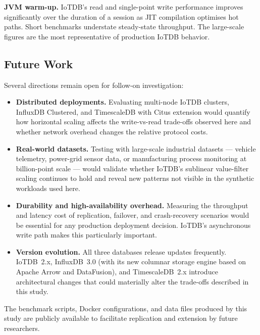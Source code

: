 \textbf{JVM warm-up.} IoTDB's read and single-point write performance improves significantly
over the duration of a session as JIT compilation optimises hot paths. Short benchmarks
understate steady-state throughput. The large-scale figures are the most representative of
production IoTDB behavior.

\subsection{Future Work}
\label{sec:future-work}

Several directions remain open for follow-on investigation:

\begin{itemize}
  \item \textbf{Distributed deployments.} Evaluating multi-node IoTDB clusters, InfluxDB
  Clustered, and TimescaleDB with Citus extension would quantify how horizontal scaling
  affects the write-vs-read trade-offs observed here and whether network overhead changes
  the relative protocol costs.

  \item \textbf{Real-world datasets.} Testing with large-scale industrial datasets ---
  vehicle telemetry, power-grid sensor data, or manufacturing process monitoring at
  billion-point scale --- would validate whether IoTDB's sublinear value-filter scaling
  continues to hold and reveal new patterns not visible in the synthetic workloads used here.

  \item \textbf{Durability and high-availability overhead.} Measuring the throughput and
  latency cost of replication, failover, and crash-recovery scenarios would be essential
  for any production deployment decision. IoTDB's asynchronous write path makes this
  particularly important.

  \item \textbf{Version evolution.} All three databases release updates frequently. IoTDB~2.x,
  InfluxDB~3.0 (with its new columnar storage engine based on Apache Arrow and DataFusion),
  and TimescaleDB~2.x introduce architectural changes that could materially alter the
  trade-offs described in this study.
\end{itemize}

The benchmark scripts, Docker configurations, and data files produced by this study are
publicly available to facilitate replication and extension by future researchers.
